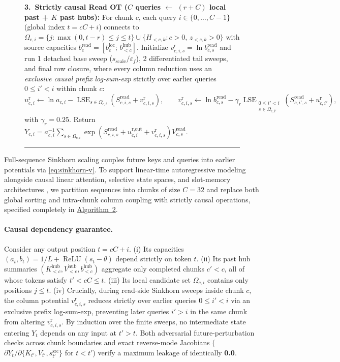 \documentclass[11pt]{article}
\newcommand{\ReLU}{\operatorname{ReLU}}
\begin{document}
\begin{figure}[t]
\begin{minipage}{\linewidth}
  \textbf{3.\ Strictly causal Read OT ($C$ queries $\leftarrow$ $(r+C)$ local past + $K$ past hubs):}
  For chunk $c$, each query $i \in \{0,\dots,C-1\}$ (global index $t=cC+i$) connects to $\Omega_{c,i} = \{j : \max(0, t-r) \le j \le t\} \cup \{H_{<c,k} : c > 0,\, z_{<c,k} > 0\}$ with source capacities $b^{\text{read}}_c = [b^{\text{loc}}_c;\, b^{\text{hub}}_{<c}]$. Initialize $v^{\text{r}}_{c,i,s} = \ln b^{\text{read}}_{c,s}$ and run 1 detached base sweep ($s_{\text{scale}}/\varepsilon_f$), 2 differentiated tail sweeps, and final row closure, where every column reduction uses an \emph{exclusive causal prefix log-sum-exp} strictly over earlier queries $0 \le i' < i$ within chunk $c$:
  \[
    u^{\text{r}}_{c,i} \leftarrow \ln a_{c,i} - \operatorname{LSE}_{s \in \Omega_{c,i}}(S^{\text{read}}_{c,i,s} + v^{\text{r}}_{c,i,s}),\qquad
    v^{\text{r}}_{c,i,s} \leftarrow \ln b^{\text{read}}_{c,s} - \gamma_r \operatorname{LSE}_{\substack{0 \le i' < i \\ s \in \Omega_{c,i'}}}(S^{\text{read}}_{c,i',s} + u^{\text{r}}_{c,i'}),
  \]
  with $\gamma_r = 0.25$. Return $Y_{c,i} = a_{c,i}^{-1} \sum_{s \in \Omega_{c,i}} \exp(S^{\text{read}}_{c,i,s} + u^{\text{r,out}}_{c,i} + v^{\text{r}}_{c,i,s}) V^{\text{read}}_{c,s}$.
  \end{minipage}
  \vspace{0.3em}
  \rule{\linewidth}{0.8pt}
\end{figure}

Full-sequence Sinkhorn scaling couples future keys and queries into earlier potentials via \eqref{eq:sinkhorn-v}. To support linear-time autoregressive modeling alongside causal linear attention, selective state spaces, and slot-memory architectures \citep{katharopoulos2020transformers,gu2024mamba,yang2024gla,zhang2024gsa}, we partition sequences into chunks of size $C=32$ and replace both global sorting and intra-chunk column coupling with strictly causal operations, specified completely in \hyperlink{alg:causal-thot}{Algorithm~2}.

\paragraph{Causal dependency guarantee.}
Consider any output position $t = cC + i$. (i) Its capacities $(a_t, b_t) = 1/L + \ReLU(s_t - \theta)$ depend strictly on token $t$. (ii) Its past hub summaries $(K^{\text{hub}}_{<c}, V^{\text{hub}}_{<c}, b^{\text{hub}}_{<c})$ aggregate only completed chunks $c' < c$, all of whose tokens satisfy $t' < cC \le t$. (iii) Its local candidate set $\Omega_{c,i}$ contains only positions $j \le t$. (iv) Crucially, during read-side Sinkhorn sweeps inside chunk $c$, the column potential $v^{\text{r}}_{c,i,s}$ reduces strictly over earlier queries $0 \le i' < i$ via an exclusive prefix log-sum-exp, preventing later queries $i' > i$ in the same chunk from altering $v^{\text{r}}_{c,i,s}$. By induction over the finite sweeps, no intermediate state entering $Y_t$ depends on any input at $t' > t$. Both adversarial future-perturbation checks across chunk boundaries and exact reverse-mode Jacobians ($\partial Y_t / \partial \{K_{t'}, V_{t'}, s^{\text{src}}_{t'}\}$ for $t < t'$) verify a maximum leakage of identically \textbf{0.0}.
\end{document}
